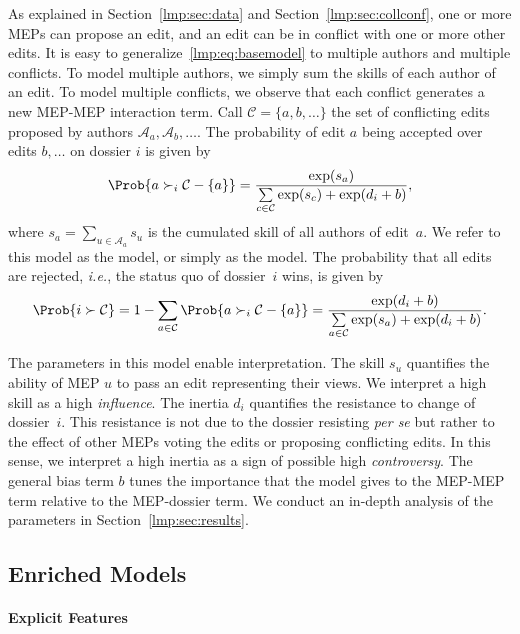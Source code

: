 As explained in Section~\ref{lmp:sec:data} and Section~\ref{lmp:sec:collconf}, one or more MEPs can propose an edit, and an edit can be in conflict with one or more other edits.
It is easy to generalize~\eqref{lmp:eq:basemodel} to multiple authors and multiple conflicts.
To model multiple authors, we simply sum the skills of each author of an edit.
To model multiple conflicts, we observe that each conflict generates a new MEP-MEP interaction term.
Call \mbox{$\mathcal{C} = \{ a, b, \dots \}$} the set of conflicting edits proposed by authors $ \mathcal{A}_a, \mathcal{A}_b, \dots $.
The probability of edit $a$ being accepted over edits $b, \dots$ on dossier $i$ is given by
\begin{equation}
	\label{lmp:eq:wowmodel}
	\Prob{ a \succ_i \mathcal{C} - \{ a\} } =
	\frac{\exp(s_a) }{ \sum\limits_{c \in \mathcal{C} } \exp(s_c) + \exp(d_i + b) },
\end{equation}
where $s_a = \sum_{u \in \mathcal{A}_a} s_u$ is the cumulated skill of all authors of edit~$a$.
We refer to this model as the \warofwords{} model, or simply as the \wow{} model.
The probability that all edits are rejected, \textit{i.e.}, the status quo of dossier~$i$ wins, is given by
\begin{equation*}
	\Prob{i \succ \mathcal{C} }
	= 1 - \sum_{a \in \mathcal{C} } \Prob{ a \succ_i \mathcal{C} - \{ a \}}
	= \frac{\exp(d_i + b) }{ \sum\limits_{a \in \mathcal{C} } \exp(s_a) + \exp(d_i + b) }.
\end{equation*}

The parameters in this model enable interpretation.
The skill $s_u$ quantifies the ability of MEP $u$ to pass an edit representing their views.
We interpret a high skill as a high \textit{influence}.
The inertia $d_i$ quantifies the resistance to change of dossier~$i$.
This resistance is not due to the dossier resisting \textit{per se} but rather to the effect of other MEPs voting the edits or proposing conflicting edits.
In this sense, we interpret a high inertia as a sign of possible high \textit{controversy}.
The general bias term $b$ tunes the importance that the model gives to the MEP-MEP term relative to the MEP-dossier term.
We conduct an in-depth analysis of the parameters in Section~\ref{lmp:sec:results}.


\subsection{Enriched Models}
\label{lmp:sec:enriched}

\paragraph{Explicit Features}

